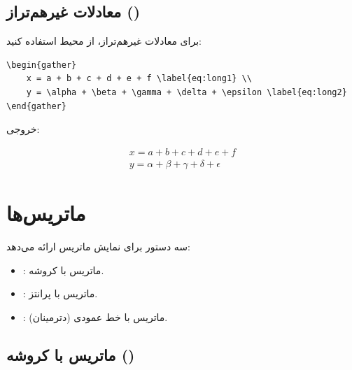 
\subsection{معادلات غیرهم‌تراز ()}
\label{sec:math-gather}

برای معادلات غیرهم‌تراز، از محیط 
استفاده کنید:

\begin{latin}
\begin{verbatim}
\begin{gather}
    x = a + b + c + d + e + f \label{eq:long1} \\
    y = \alpha + \beta + \gamma + \delta + \epsilon \label{eq:long2}
\end{gather}
\end{verbatim}
\end{latin}

خروجی:

\begin{gather}
    x = a + b + c + d + e + f \label{eq:long1-ch9} \\
    y = \alpha + \beta + \gamma + \delta + \epsilon \label{eq:long2-ch9}
\end{gather}


\section{ماتریس‌ها}
\label{sec:math-matrices}

 سه دستور برای نمایش ماتریس
ارائه می‌دهد:

\begin{itemize}
    \item {}: ماتریس با کروشه.
    \item {}: ماتریس با پرانتز.
    \item {}: ماتریس با خط عمودی
    (دترمینان).
\end{itemize}

\subsection{ماتریس با کروشه ()}
\label{sec:math-mat-bracket}

